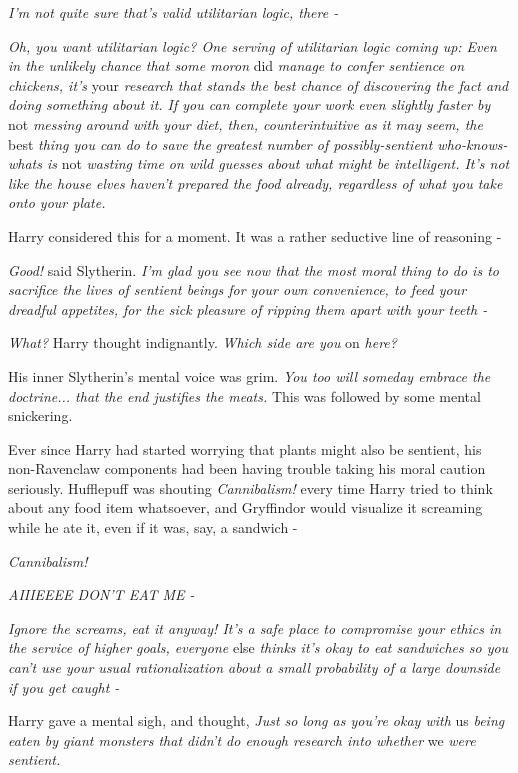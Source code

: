 \emph{I'm not quite sure that's valid utilitarian logic, there -}

\emph{Oh, you want utilitarian logic? One serving of utilitarian logic coming up: Even in the unlikely chance that some moron} did \emph{manage to confer sentience on chickens, it's} your \emph{research that stands the best chance of discovering the fact and doing something about it. If you can complete your work even slightly faster by} not \emph{messing around with your diet, then, counterintuitive as it may seem, the} best \emph{thing you can do to save the greatest number of possibly-sentient who-knows-whats is} not \emph{wasting time on wild guesses about what might be intelligent. It's not like the house elves haven't prepared the food already, regardless of what you take onto your plate.}

Harry considered this for a moment. It was a rather seductive line of reasoning -

\emph{Good!} said Slytherin. \emph{I'm glad you see now that the most moral thing to do is to sacrifice the lives of sentient beings for your own convenience, to feed your dreadful appetites, for the sick pleasure of ripping them apart with your teeth -}

\emph{What?} Harry thought indignantly. \emph{Which side are you} on \emph{here?}

His inner Slytherin's mental voice was grim. \emph{You too will someday embrace the doctrine... that the end justifies the meats.} This was followed by some mental snickering.

Ever since Harry had started worrying that plants might also be sentient, his non-Ravenclaw components had been having trouble taking his moral caution seriously. Hufflepuff was shouting \emph{Cannibalism!} every time Harry tried to think about any food item whatsoever, and Gryffindor would visualize it screaming while he ate it, even if it was, say, a sandwich -

\emph{Cannibalism!}

\emph{AIIIEEEE DON'T EAT ME -}

\emph{Ignore the screams, eat it anyway! It's a safe place to compromise your ethics in the service of higher goals, everyone} else \emph{thinks it's okay to eat sandwiches so you can't use your usual rationalization about a small probability of a large downside if you get caught -}

Harry gave a mental sigh, and thought, \emph{Just so long as you're okay with} us \emph{being eaten by giant monsters that didn't do enough research into whether} we \emph{were sentient.}

